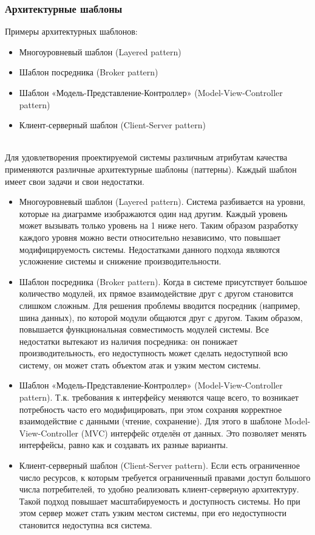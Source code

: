\documentclass{../industrial-development}
\begin{document}
\begin{frame} \frametitle{Архитектурные шаблоны}
	Примеры архитектурных шаблонов: 
	\begin{itemize}
		\item Многоуровневый шаблон (Layered pattern)
		\item Шаблон посредника (Broker pattern)
		\item Шаблон «Модель-Представление-Контроллер» (Model-View-Controller pattern)
		\item Клиент-серверный шаблон (Client-Server pattern)
	\end{itemize}	
\end{frame}
\lecturenotes
\\Для удовлетворения проектируемой системы различным атрибутам качества применяются различные архитектурные шаблоны (паттерны). Каждый шаблон имеет свои задачи и свои недостатки.\\
\begin{itemize}
\item Многоуровневый шаблон (Layered pattern). Система разбивается на уровни, которые на диаграмме изображаются один над другим. Каждый уровень может вызывать только уровень на 1 ниже него. Таким образом разработку каждого уровня можно вести относительно независимо, что повышает модифицируемость системы. Недостатками данного подхода являются усложнение системы и снижение производительности.
\item Шаблон посредника (Broker pattern). Когда в системе присутствует большое количество модулей, их прямое взаимодействие друг с другом становится слишком сложным. Для решения проблемы вводится посредник (например, шина данных), по которой модули общаются друг с другом. Таким образом, повышается функциональная совместимость модулей системы. Все недостатки вытекают из наличия посредника: он понижает производительность, его недоступность может сделать недоступной всю систему, он может стать объектом атак и узким местом системы.
\item Шаблон «Модель-Представление-Контроллер» (Model-View-Controller pattern). Т.к. требования к интерфейсу меняются чаще всего, то возникает потребность часто его модифицировать, при этом сохраняя корректное взаимодействие с данными (чтение, сохранение). Для этого в шаблоне Model-View-Controller (MVC) интерфейс отделён от данных. Это позволяет менять интерфейсы, равно как и создавать их разные варианты.
\item Клиент-серверный шаблон (Client-Server pattern). Если есть ограниченное число ресурсов, к которым требуется ограниченный правами доступ большого числа потребителей, то удобно реализовать клиент-серверную архитектуру. Такой подход повышает масштабируемость и доступность системы. Но при этом сервер может стать узким местом системы, при его недоступности становится недоступна вся система.
\end{itemize}
\end{document}
